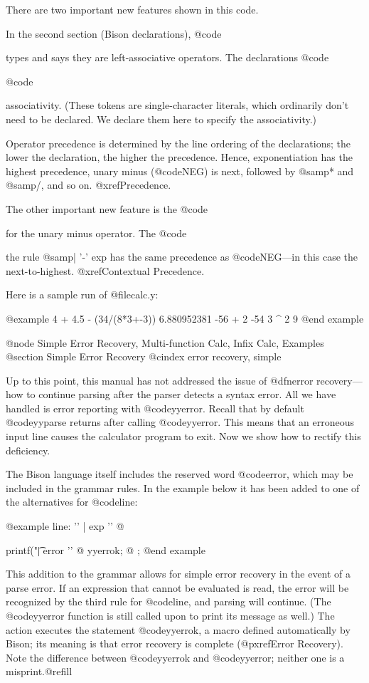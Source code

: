 {{{{There are two important new features shown in this code.

In the second section (Bison declarations), @code{%
types and says they are left-associative operators.  The declarations
@code{%
@code{%
associativity.  (These tokens are single-character literals, which
ordinarily don't need to be declared.  We declare them here to specify
the associativity.)

Operator precedence is determined by the line ordering of the declarations;
the lower the declaration, the higher the precedence.  Hence,
exponentiation has the highest precedence, unary minus (@code{NEG}) is next,
followed by @samp{*} and @samp{/}, and so on.  @xref{Precedence}.

The other important new feature is the @code{%
for the unary minus operator.  The @code{%
the rule @samp{| '-' exp} has the same precedence as @code{NEG}---in this
case the next-to-highest.  @xref{Contextual Precedence}.

Here is a sample run of @file{calc.y}:

@example
4 + 4.5 - (34/(8*3+-3))
6.880952381
-56 + 2
-54
3 ^ 2
9
@end example

@node Simple Error Recovery, Multi-function Calc, Infix Calc, Examples
@section Simple Error Recovery
@cindex error recovery, simple

Up to this point, this manual has not addressed the issue of @dfn{error
recovery}---how to continue parsing after the parser detects a syntax
error.  All we have handled is error reporting with @code{yyerror}.  Recall
that by default @code{yyparse} returns after calling @code{yyerror}.  This
means that an erroneous input line causes the calculator program to exit.
Now we show how to rectify this deficiency.

The Bison language itself includes the reserved word @code{error}, which
may be included in the grammar rules.  In the example below it has
been added to one of the alternatives for @code{line}:

@example
line:     '\n'
        | exp '\n'   @{ printf("\t%
        | error '\n' @{ yyerrok;                 @}
;
@end example

This addition to the grammar allows for simple error recovery in the event
of a parse error.  If an expression that cannot be evaluated is read, the
error will be recognized by the third rule for @code{line}, and parsing
will continue.  (The @code{yyerror} function is still called upon to print
its message as well.)  The action executes the statement @code{yyerrok}, a
macro defined automatically by Bison; its meaning is that error recovery is
complete (@pxref{Error Recovery}).  Note the difference between
@code{yyerrok} and @code{yyerror}; neither one is a misprint.@refill

}}}}}}}}}}

